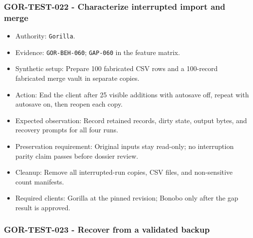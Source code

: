 \documentclass[
  letterpaper,
]{article}
\newcommand{\passthrough}[1]{#1}
\providecommand{\tightlist}{%
  \setlength{\itemsep}{0pt}\setlength{\parskip}{0pt}}
\begin{document}
\subsubsection{GOR-TEST-022 - Characterize interrupted import and
merge}\label{gor-test-022---characterize-interrupted-import-and-merge}

\begin{itemize}
\tightlist
\item
  Authority: \passthrough{\lstinline!Gorilla!}.
\item
  Evidence: \nolinkurl{GOR-BEH-060}; \passthrough{\lstinline!GAP-060!} in the feature matrix.
\item
  Synthetic setup: Prepare 100 fabricated CSV rows and a 100-record fabricated merge vault in separate copies.
\item
  Action: End the client after 25 visible additions with autosave off, repeat with autosave on, then reopen each copy.
\item
  Expected observation: Record retained records, dirty state, output bytes, and recovery prompts for all four runs.
\item
  Preservation requirement: Original inputs stay read-only; no interruption parity claim passes before dossier review.
\item
  Cleanup: Remove all interrupted-run copies, CSV files, and non-sensitive count manifests.
\item
  Required clients: Gorilla at the pinned revision; Bonobo only after the gap result is approved.
\end{itemize}

\subsubsection{GOR-TEST-023 - Recover from a validated backup}\label{gor-test-023---recover-from-a-validated-backup}
\end{document}
